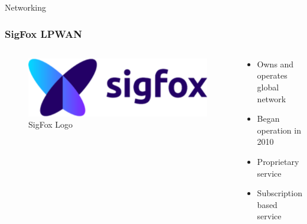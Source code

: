 \documentclass{beamer}
\begin{document}
  \begin{frame}{Networking}
    \frametitle{SigFox LPWAN}
    \begin{columns}
      \begin{column}{0.5\textwidth}
        \begin{figure}[htbp]
          \centering
          \includegraphics[width=\textwidth]{images/sigfox_logo.png}
          \caption{SigFox Logo}
          \label{fig:SigFox_logo}
        \end{figure}
      \end{column}
      \begin{column}{0.5\textwidth}
        \begin{itemize}
          \item Owns and operates global network
          \item Began operation in 2010
          \item Proprietary service
          \item Subscription based service
        \end{itemize}
      \end{column}
    \end{columns}
  \end{frame}
\end{document}
